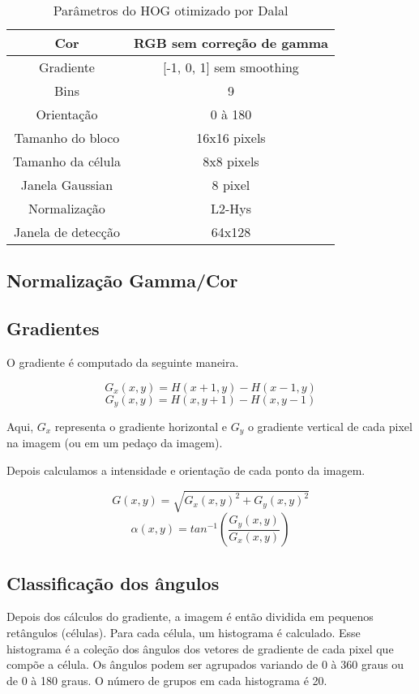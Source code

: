 
\begin{table}[h]
\centering
\begin{tabular}{|c|c|}
\hline Cor & RGB sem correção de gamma \\ 
\hline Gradiente & [-1, 0, 1] sem smoothing \\ 
\hline Bins & 9 \\
\hline Orientação & 0 à 180 \\
\hline Tamanho do bloco & 16x16 pixels \\
\hline Tamanho da célula & 8x8 pixels \\
\hline Janela Gaussian & 8 pixel \\
\hline Normalização & L2-Hys \\
\hline Janela de detecção & 64x128 \\
\hline 
\end{tabular} 
\caption{Parâmetros do HOG otimizado por Dalal}
\label{table:dlal_hog}
\end{table}

\subsection{Normalização Gamma/Cor}

\subsection{Gradientes}

O gradiente é computado da seguinte maneira.

\[G_{x}(x,y) = H(x+1, y) - H(x-1, y)\]
\[G_{y}(x,y) = H(x, y+1) - H(x, y-1)\]

Aqui, \(G_{x}\) representa o gradiente horizontal e \(G_{y}\) o gradiente vertical de cada pixel na imagem (ou em um pedaço da imagem).

Depois calculamos a intensidade e orientação de cada ponto da imagem.

\[G(x,y) = \sqrt{G_{x}(x,y)^{2} + G_{y}(x,y)^{2}}\]
\[\alpha (x,y) = tan^{-1} \left(\frac{G_{y}(x,y)}{G_{x}(x,y)}\right)\]

\subsection{Classificação dos ângulos}

Depois dos cálculos do gradiente, a imagem é então dividida em pequenos retângulos (células). Para cada célula, um histograma é calculado. Esse histograma é a coleção dos ângulos dos vetores de gradiente de cada pixel que compõe a célula. Os ângulos podem ser agrupados variando de 0 à 360 graus ou de 0 à 180 graus. O número de grupos em cada histograma é 20.

